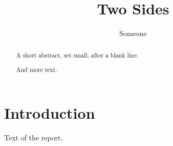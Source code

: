 \documentclass[twoside]{report}
\title{Two Sides}
\author{Someone}
\begin{document}
\maketitle
\begin{abstract}

{\small A short abstract, set small, after a blank line.\par}
And more text.
\end{abstract}
\chapter{Introduction}
Text of the report.
\end{document}
